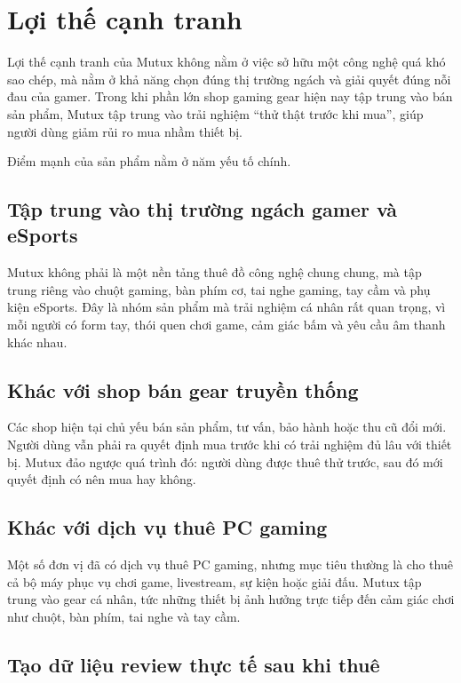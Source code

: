 \section{Lợi thế cạnh tranh}

Lợi thế cạnh tranh của Mutux không nằm ở việc sở hữu một công nghệ quá khó sao chép, mà nằm ở khả năng chọn đúng thị trường ngách và giải quyết đúng nỗi đau của gamer. Trong khi phần lớn shop gaming gear hiện nay tập trung vào bán sản phẩm, Mutux tập trung vào trải nghiệm ``thử thật trước khi mua'', giúp người dùng giảm rủi ro mua nhầm thiết bị.

Điểm mạnh của sản phẩm nằm ở năm yếu tố chính.

\subsection{Tập trung vào thị trường ngách gamer và eSports}

Mutux không phải là một nền tảng thuê đồ công nghệ chung chung, mà tập trung riêng vào chuột gaming, bàn phím cơ, tai nghe gaming, tay cầm và phụ kiện eSports. Đây là nhóm sản phẩm mà trải nghiệm cá nhân rất quan trọng, vì mỗi người có form tay, thói quen chơi game, cảm giác bấm và yêu cầu âm thanh khác nhau.

\subsection{Khác với shop bán gear truyền thống}

Các shop hiện tại chủ yếu bán sản phẩm, tư vấn, bảo hành hoặc thu cũ đổi mới. Người dùng vẫn phải ra quyết định mua trước khi có trải nghiệm đủ lâu với thiết bị. Mutux đảo ngược quá trình đó: người dùng được thuê thử trước, sau đó mới quyết định có nên mua hay không.

\subsection{Khác với dịch vụ thuê PC gaming}

Một số đơn vị đã có dịch vụ thuê PC gaming, nhưng mục tiêu thường là cho thuê cả bộ máy phục vụ chơi game, livestream, sự kiện hoặc giải đấu. Mutux tập trung vào gear cá nhân, tức những thiết bị ảnh hưởng trực tiếp đến cảm giác chơi như chuột, bàn phím, tai nghe và tay cầm.

\subsection{Tạo dữ liệu review thực tế sau khi thuê}

